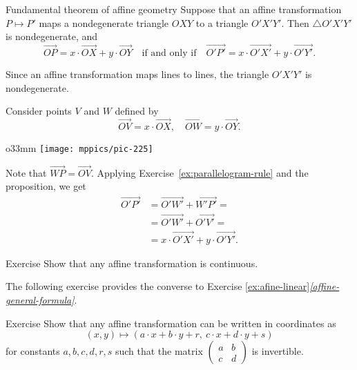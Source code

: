 \begin{thm}{Fundamental theorem of affine geometry}\label{thm:fundamental-theorem-of-affine-geometry}
Suppose that an affine transformation $P\mapsto P'$ maps a nondegenerate triangle $OXY$ to a triangle $O'X'Y'$.
Then $\triangle O'X'Y'$ is nondegenerate, and
\[\overrightarrow{OP}=x\cdot\overrightarrow{OX}+y\cdot\overrightarrow{OY}\quad\text{if and only if}\quad\overrightarrow{O'P'}=x\cdot\overrightarrow{O'X'}+y\cdot\overrightarrow{O'Y'}.\]
\end{thm}

Since an affine transformation maps lines to lines, the triangle
$O'X'Y'$ is nondegenerate.

Consider points $V$ and $W$ defined by
\[\overrightarrow{OV}=x\cdot\overrightarrow{OX},
\quad
\overrightarrow{OW}=y\cdot\overrightarrow{OY}.
\]

{

\begin{wrapfigure}{o}{33mm}
\centering
\vskip-0mm
\texttt{[image: mppics/pic-225]}
\end{wrapfigure}

Note that 
$\overrightarrow{WP}=\overrightarrow{OV}$.
Applying Exercise~\ref{ex:parallelogram-rule} and the proposition, we get
\begin{align*}\overrightarrow{O'P'}&=\overrightarrow{O'W'}+\overrightarrow{W'P'}=
\\
&=\overrightarrow{O'W'}+\overrightarrow{O'V'}=
\\
&=x\cdot\overrightarrow{O'X'}+y\cdot\overrightarrow{O'Y'}.
\end{align*}
\qedsf

}

\begin{thm}{Exercise}\label{ex:affine-continuous}
Show that any affine transformation is continuous.
\end{thm}

The following exercise provides the converse to Exercise \ref{ex:afine-linear}\textit{\ref{affine-general-formula}}.

\begin{thm}{Exercise}\label{ex:affine-coordinates}
Show that any affine transformation can be written in coordinates as 
\[(x,y)\mapsto(a\cdot x+b\cdot y+r,\ c\cdot x+d\cdot y+s)\]
for constants $a,b,c,d,r,s$ such that the matrix $(\begin{smallmatrix}a&b\\c&d\end{smallmatrix})$ is invertible. 
\end{thm}

